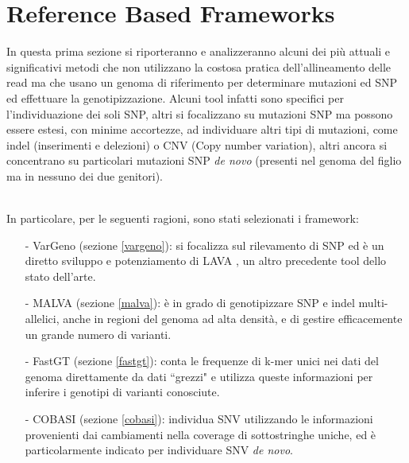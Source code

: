 \documentclass[../main.tex]{subfiles}
\begin{document}
\section{Reference Based Frameworks}
\label{rbm}

In questa prima sezione si riporteranno e analizzeranno alcuni dei più attuali e significativi metodi che non utilizzano la costosa pratica dell'allineamento delle read ma che usano un genoma di riferimento per determinare mutazioni ed SNP ed effettuare la genotipizzazione. Alcuni tool infatti sono specifici per l'individuazione dei soli SNP, altri si focalizzano su mutazioni SNP ma possono essere estesi, con minime accortezze, ad individuare altri tipi di mutazioni, come indel (inserimenti e delezioni) o CNV (Copy number variation), altri ancora si concentrano su particolari mutazioni SNP \textit{de novo} \textcolor{BurntOrange}{(presenti nel genoma del figlio ma in nessuno dei due genitori).}

\noindent
\\
In particolare, per le seguenti ragioni, sono stati selezionati i framework:
\begin{itemize} 
\item[-] VarGeno (sezione \ref{vargeno}): \cite{sun-medvedev2018vargeno} si focalizza sul rilevamento di SNP ed è un diretto sviluppo e potenziamento di LAVA \cite{shajii2016lava}, un altro precedente tool dello stato dell'arte.
\item[-] MALVA (sezione \ref{malva}): \cite{bernardini2019malva} è in grado di genotipizzare SNP e indel multi-allelici, anche in regioni del genoma ad alta densità, e di gestire efficacemente un grande numero di varianti.
\item[-] FastGT (sezione \ref{fastgt}): \cite{pajuste2017fastgt} conta le frequenze di k-mer unici nei dati del genoma direttamente da dati ``grezzi" e utilizza queste informazioni per inferire i genotipi di varianti conosciute. 
\item[-] COBASI (sezione \ref{cobasi}): \cite{gomez-romero2018cobasi} individua SNV utilizzando le informazioni provenienti dai cambiamenti nella coverage di sottostringhe uniche, ed è particolarmente indicato per individuare SNV \textit{de novo}. 
\end{itemize} 
\end{document}
